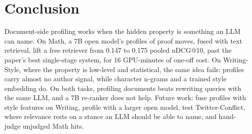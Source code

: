 \documentclass[conference]{IEEEtran}
\begin{document}
\section{Conclusion}
Document-side profiling works when the hidden property is something an LLM can name. On Math, a 7B open model's profiles of proof moves, fused with text retrieval, lift a free retriever from 0.147 to 0.175 pooled nDCG@10, past the paper's best single-stage system, for 16 GPU-minutes of one-off cost. On Writing-Style, where the property is low-level and statistical, the same idea fails: profiles carry almost no author signal, while character n-grams and a trained style embedding do. On both tasks, profiling documents beats rewriting queries with the same LLM, and a 7B re-ranker does not help. Future work: fuse profiles with style features on Writing, profile with a larger open model, test Twitter-Conflict, where relevance rests on a stance an LLM should be able to name, and hand-judge unjudged Math hits.



\end{document}

